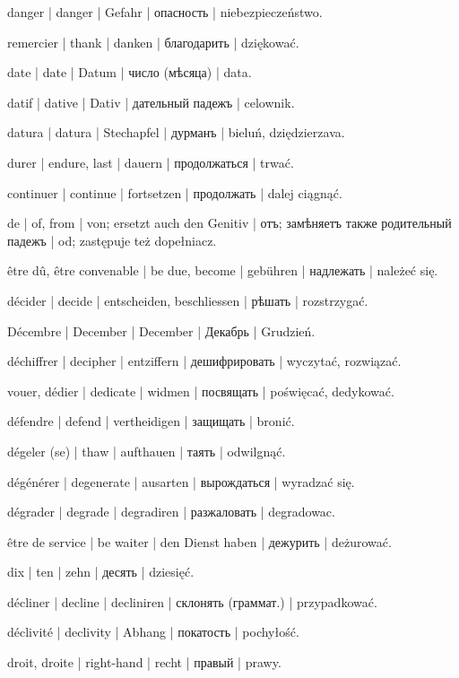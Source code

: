 \begin{outdent}{1em}
danger | danger | Gefahr | опасность | niebezpieczeństwo.

remercier | thank | danken | благодарить | dziękować.

date | date | Datum | число (мѣсяца) | data.

datif | dative | Dativ | дательный падежъ | celownik.

datura | datura | Stechapfel | дурманъ | bieluń, dziędzierzava.

durer | endure, last | dauern | продолжаться | trwać.

\uvsubentry{}
continuer | continue | fortsetzen | продолжать | dalej ciągnąć.

de | of, from | von; ersetzt auch den Genitiv | отъ; замѣняетъ
также родительный падежъ | od; zastępuje też dopełniacz.

être dû, être convenable | be due, become | gebühren | надлежать | należeć się.

décider | decide | entscheiden, beschliessen | рѣшать | rozstrzygać.

Décembre | December | December | Декабрь | Grudzień.

déchiffrer | decipher | entziffern | дешифрировать | wyczytać, rozwiązać.

vouer, dédier | dedicate | widmen | посвящать | poświęcać, dedykować.

défendre | defend | vertheidigen | защищать | bronić.

dégeler (se) | thaw | aufthauen | таять | odwilgnąć.

dégénérer | degenerate | ausarten | вырождаться | wyradzać się.

dégrader | degrade | degradiren | разжаловать | degradowac.

être de service | be waiter | den Dienst haben | дежурить | deżurować.

dix | ten | zehn | десять | dziesięć.

décliner | decline | decliniren | склонять (граммат.) | przypadkować.

déclivité | declivity | Abhang | покатость | pochyłość.

droit, droite | right-hand | recht | правый | prawy.


\end{outdent}
